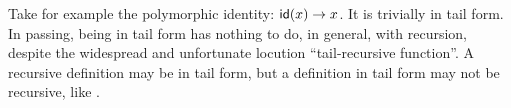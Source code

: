 Take for example the polymorphic identity: \(\textsf{id}(x) \rightarrow
x\). It is trivially in tail form. In passing, being in tail form has
nothing to do, in general, with recursion, despite the widespread and
unfortunate locution ``tail\hyp{}recursive function''. A recursive
definition may be in tail form, but a definition in tail form may not
be recursive, like .
